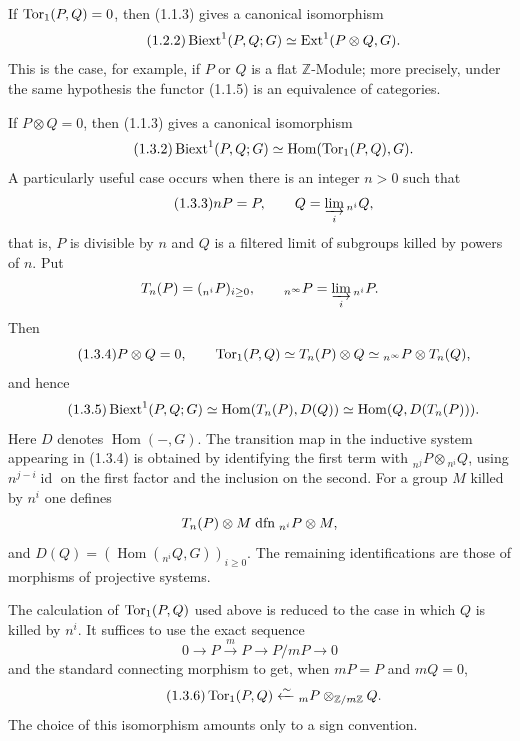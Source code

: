 \documentclass[11pt]{article}
\providecommand{\liminj}{\varinjlim}
\providecommand{\Hom}{\operatorname{Hom}}
\providecommand{\Ext}{\operatorname{Ext}}
\providecommand{\id}{\operatorname{id}}
\begin{document}
If \(\operatorname{Tor}_1(P,Q)=0\), then (1.1.3) gives a canonical isomorphism
\begin{equation}\qquad\text{(1.2.2)}
        \Biext^1(P,Q;G)\simeq \Ext^1(P\otimes Q,G).
\end{equation}
This is the case, for example, if \(P\) or \(Q\) is a flat \(\mathbb Z\)-Module; more precisely, under the same hypothesis the functor (1.1.5) is an equivalence of categories.

If \(P\otimes Q=0\), then (1.1.3) gives a canonical isomorphism
\begin{equation}\qquad\text{(1.3.2)}
        \Biext^1(P,Q;G)\simeq \Hom(\Torop_1(P,Q),G).
\end{equation}
A particularly useful case occurs when there is an integer \(n>0\) such that
\begin{equation}\qquad\text{(1.3.3)}
        nP=P,
        \qquad
        Q=\liminj_i {}_{n^i}Q,
\end{equation}
that is, \(P\) is divisible by \(n\) and \(Q\) is a filtered limit of subgroups killed by powers of \(n\).  Put
\[
        T_n(P)=({}_{n^i}P)_{i\ge0},
        \qquad
        {}_{n^\infty}P=\liminj_i {}_{n^i}P.
\]
Then
\begin{equation}\qquad\text{(1.3.4)}
        P\otimes Q=0,
        \qquad
        \operatorname{Tor}_1(P,Q)\simeq T_n(P)\otimes Q
        \simeq {}_{n^\infty}P\otimes T_n(Q),
\end{equation}
and hence
\begin{equation}\qquad\text{(1.3.5)}
        \Biext^1(P,Q;G)
        \simeq \Hom(T_n(P),D(Q))
        \simeq \Hom(Q,D(T_n(P))).
\end{equation}
Here \(D\) denotes \(\Hom(-,G)\).  The transition map in the inductive system appearing in (1.3.4) is obtained by identifying the first term with \({}_{n^j}P\otimes{}_{n^i}Q\), using \(n^{j-i}\id\) on the first factor and the inclusion on the second.  For a group \(M\) killed by \(n^i\) one defines
\[
        T_n(P)\otimes M\mathrel{\mathrm{dfn}} {}_{n^i}P\otimes M,
\]
and \(D(Q)=(\Hom({}_{n^i}Q,G))_{i\ge0}\).  The remaining identifications are those of morphisms of projective systems.

The calculation of \(\operatorname{Tor}_1(P,Q)\) used above is reduced to the case in which \(Q\) is killed by \(n^i\).  It suffices to use the exact sequence
\[
        0\to P\xrightarrow{m}P\to P/mP\to0
\]
and the standard connecting morphism to get, when \(mP=P\) and \(mQ=0\),
\begin{equation}\qquad\text{(1.3.6)}
        \operatorname{Tor}_1(P,Q)\xleftarrow{\sim}{}_mP\otimes_{\mathbb Z/m\mathbb Z} Q.
\end{equation}
The choice of this isomorphism amounts only to a sign convention.
\end{document}

